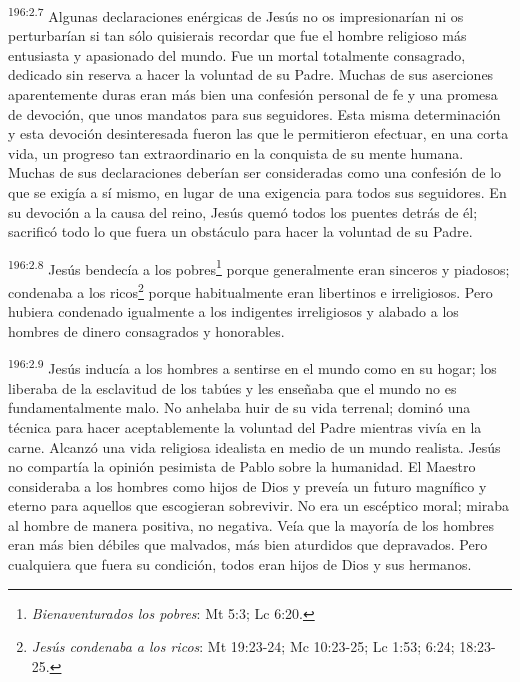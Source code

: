 \par
\textsuperscript{196:2.7} Algunas declaraciones enérgicas de Jesús no os impresionarían ni os perturbarían si tan sólo quisierais recordar que fue el hombre religioso más entusiasta y apasionado del mundo. Fue un mortal totalmente consagrado, dedicado sin reserva a hacer la voluntad de su Padre. Muchas de sus aserciones aparentemente duras eran más bien una confesión personal de fe y una promesa de devoción, que unos mandatos para sus seguidores. Esta misma determinación y esta devoción desinteresada fueron las que le permitieron efectuar, en una corta vida, un progreso tan extraordinario en la conquista de su mente humana. Muchas de sus declaraciones deberían ser consideradas como una confesión de lo que se exigía a sí mismo, en lugar de una exigencia para todos sus seguidores. En su devoción a la causa del reino, Jesús quemó todos los puentes detrás de él; sacrificó todo lo que fuera un obstáculo para hacer la voluntad de su Padre.

\par
\textsuperscript{196:2.8} Jesús bendecía a los pobres\footnote{\textit{Bienaventurados los pobres}: Mt 5:3; Lc 6:20.} porque generalmente eran sinceros y piadosos; condenaba a los ricos\footnote{\textit{Jesús condenaba a los ricos}: Mt 19:23-24; Mc 10:23-25; Lc 1:53; 6:24; 18:23-25.} porque habitualmente eran libertinos e irreligiosos. Pero hubiera condenado igualmente a los indigentes irreligiosos y alabado a los hombres de dinero consagrados y honorables.

\par
\textsuperscript{196:2.9} Jesús inducía a los hombres a sentirse en el mundo como en su hogar; los liberaba de la esclavitud de los tabúes y les enseñaba que el mundo no es fundamentalmente malo. No anhelaba huir de su vida terrenal; dominó una técnica para hacer aceptablemente la voluntad del Padre mientras vivía en la carne. Alcanzó una vida religiosa idealista en medio de un mundo realista. Jesús no compartía la opinión pesimista de Pablo sobre la humanidad. El Maestro consideraba a los hombres como hijos de Dios y preveía un futuro magnífico y eterno para aquellos que escogieran sobrevivir. No era un escéptico moral; miraba al hombre de manera positiva, no negativa. Veía que la mayoría de los hombres eran más bien débiles que malvados, más bien aturdidos que depravados. Pero cualquiera que fuera su condición, todos eran hijos de Dios y sus hermanos.

